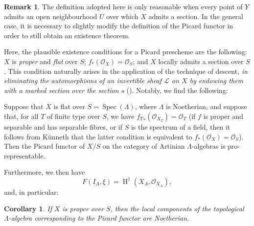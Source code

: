 \documentclass{article}
\theoremstyle{plain}
\newenvironment{proposition}[1]
  {\renewcommand\theinnercustomproposition{#1}\innercustomproposition}
  {\endinnercustomproposition}
\newtheorem*{corollary*}{Corollary}
\theoremstyle{definition}
\newtheorem*{remark*}{Remark}
\newcommand{\sh}[1]{{\mathscr{#1}}}
\DeclareMathOperator{\HH}{H}
\DeclareMathOperator{\Spec}{Spec}
\begin{document}
\begin{remark*}
  The definition adopted here is only reasonable when every point of $Y$ admits an open neighbourhood $U$ over which $X$ admits a section.
  In the general case, it is necessary to slightly modify the definition of the Picard functor in order to still obtain an existence theorem.

  Here, the plausible existence conditions for a Picard prescheme are the following: $X$ is \emph{proper} and \emph{flat} over $S$; $f_*(\sh{O}_X)=\sh{O}_S$; and $X$ locally admits a section over $S$.
  This condition naturally arises in the application of the technique of descent, \emph{in eliminating the automorphisms of an invertible sheaf $\sh{L}$ on $X$ by endowing them with a marked section over the section $s$} (\cite[B.4]{3}).
  Notably, we find the following:
\end{remark*}

\begin{proposition}{3.1}
\label{C.3-proposition1}
  Suppose that $X$ is flat over $S=\Spec(\Lambda)$, where $\Lambda$ is Noetherian, and suppose that, for all $T$ of finite type over $S$, we have ${f_T}_*(\sh{O}_{X_T})=\sh{O}_T$ (if $f$ is proper and separable and has separable fibres, or if $S$ is the spectrum of a field, then it follows from K\"{u}nneth that the latter condition is equivalent to $f_*(\sh{O}_X)=\sh{O}_S$).
  Then the Picard functor of $X/S$ on the category of Artinian $\Lambda$-algebras is pro-representable.

  Furthermore, we then have
  \[
    F(I_A,\xi) = \HH^1(X_A,\sh{O}_{X_A}),
  \]
  and, in particular:
\end{proposition}

\begin{corollary*}
  If $X$ is proper over $S$, then the local components of the topological $\Lambda$-algebra corresponding to the Picard functor are Noetherian.
\end{corollary*}
\end{document}
